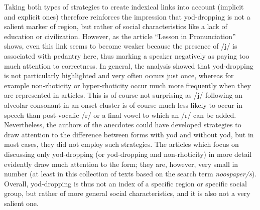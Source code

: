 Taking both types of strategies to create indexical links into account (implicit and explicit ones) therefore reinforces the impression that yod-dropping is not a salient marker of region, but rather of social characteristics like a lack of education or civilization. However, as the article “Lesson in Pronunciation” shows, even this link seems to become weaker because the presence of /j/ is associated with pedantry here, thus marking a speaker negatively as paying too much attention to correctness. In general, the analysis showed that yod-dropping is not particularly highlighted and very often occurs just once, whereas for example non-rhoticity or hyper-rhoticity occur much more frequently when they are represented in articles. This is of course not surprising as /j/ following an alveolar consonant in an onset cluster is of course much less likely to occur in speech than post-vocalic /r/ or a final vowel to which an /r/ can be added. Nevertheless, the authors of the anecdotes could have developed strategies to draw attention to the difference between forms with yod and without yod, but in most cases, they did not employ such strategies. The articles which focus on discussing only yod-dropping (or yod-dropping and non-rhoticity) in more detail evidently draw much attention to the form; they are, however, very small in number (at least in this collection of texts based on the search term \emph{noospaper/s}). Overall, yod-dropping is thus not an index of a specific region or specific social group, but rather of more general social characteristics, and it is also not a very salient one.

